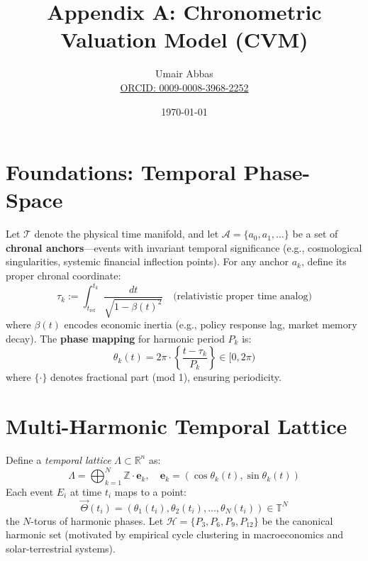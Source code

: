 \documentclass[11pt]{article}
\title{Appendix A: Chronometric Valuation Model (CVM)}
\author{Umair Abbas \\ \href{https://orcid.org/0009-0008-3968-2252}{ORCID: 0009-0008-3968-2252}}
\date{\today}
\begin{document}
\maketitle

\section{Foundations: Temporal Phase-Space}
Let $\mathcal{T}$ denote the physical time manifold, and let $\mathcal{A} = \{a_0, a_1, \dots\}$
be a set of \textbf{chronal anchors}—events with invariant temporal significance (e.g.,
cosmological singularities, systemic financial inflection points). For any anchor $a_k$, define its
proper chronal coordinate:
\[
\tau_k := \int_{t_{\text{ref}}}^{t_k} \frac{dt}{\sqrt{1 - \beta(t)^2}} \quad \text{(relativistic proper time
analog)}
\]
where $\beta(t)$ encodes economic inertia (e.g., policy response lag, market memory decay).
The \textbf{phase mapping} for harmonic period $P_k$ is:
\begin{equation}
\theta_k(t) = 2\pi \cdot \left\{ \frac{t - \tau_k}{P_k} \right\} \in [0, 2\pi)
\end{equation}
where $\{\cdot\}$ denotes fractional part (mod 1), ensuring periodicity.

\section{Multi-Harmonic Temporal Lattice}
Define a \textit{temporal lattice} $\Lambda \subset \mathbb{R}^n$ as:
\[
\Lambda = \bigoplus_{k=1}^{N} \mathbb{Z} \cdot \mathbf{e}_k, \quad \mathbf{e}_k = \left(
\cos\theta_k(t), \sin\theta_k(t) \right)
\]
Each event $E_i$ at time $t_i$ maps to a point:
\[
\vec{\Theta}(t_i) = \left( \theta_1(t_i), \theta_2(t_i), \dots, \theta_N(t_i) \right) \in \mathbb{T}^N
\]
the $N$-torus of harmonic phases.
Let $\mathcal{H} = \{P_3, P_6, P_9, P_{12}\}$ be the canonical harmonic set (motivated by
empirical cycle clustering in macroeconomics and solar-terrestrial systems).
\end{document}
